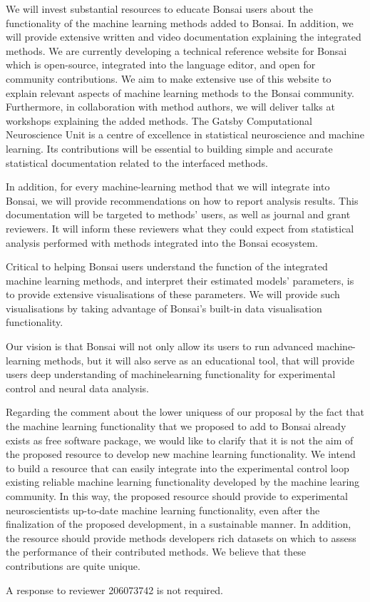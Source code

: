 \documentclass[11pt]{letter}
\begin{document}
\begin{letter}{
}
We will invest substantial resources to educate Bonsai users about the
functionality of the machine learning methods added to Bonsai. In addition, we
will provide extensive written and video documentation explaining the
integrated methods. We are currently developing a technical reference  website
for Bonsai which is open-source, integrated into the language editor, and open
for community contributions. We aim to make extensive use of this website to
explain relevant aspects of machine learning methods to the Bonsai community.
Furthermore, in collaboration with method authors, we will deliver talks at
workshops explaining the added methods.
%
The Gatsby Computational Neuroscience Unit is a centre of excellence in
statistical neuroscience and machine learning. Its contributions will be
essential to building simple and accurate statistical documentation related to
the interfaced methods.

In addition, for every machine-learning method that we will integrate into
Bonsai, we will provide recommendations on how to report analysis results.
This documentation will be targeted to methods' users, as well as journal and
grant reviewers. It will inform these reviewers what they could expect from
statistical analysis performed with methods integrated into the Bonsai
ecosystem.

Critical to helping Bonsai users understand the function of the integrated
machine learning methods, and interpret their estimated models' parameters, is
to provide extensive visualisations of these parameters. We will provide such
visualisations by taking advantage of Bonsai's built-in data visualisation
functionality.

Our vision is that Bonsai will not only allow its users to run advanced
machine-learning methods, but it will also serve as an educational tool, that
will provide users deep understanding of machinelearning functionality for
experimental control and neural data analysis.

Regarding the comment about the lower uniquess of our proposal by the fact that
the machine learning functionality that we proposed to add to Bonsai already
exists as free software package, we would like to clarify that it is not the
aim of the proposed resource to develop new machine learning functionality. We
intend to build a resource that can easily integrate into the experimental
control loop existing reliable machine learning functionality developed by the
machine learing community. In this way, the proposed resource should provide to
experimental neuroscientists up-to-date machine learning functionality, even
after the finalization of the proposed development, in a sustainable manner. In
addition, the resource should provide methods developers rich datasets on which
to assess the performance of their contributed methods.  We believe that these
contributions are quite unique.

\pagebreak

A response to reviewer 206073742 is not required. 

\end{letter}
\end{document}
